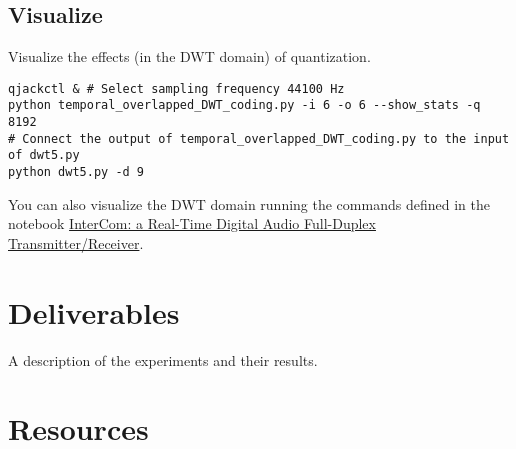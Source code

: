 
\subsection{Visualize}

Visualize the effects (in the DWT domain) of quantization.
\begin{verbatim}
qjackctl & # Select sampling frequency 44100 Hz 
python temporal_overlapped_DWT_coding.py -i 6 -o 6 --show_stats -q 8192
# Connect the output of temporal_overlapped_DWT_coding.py to the input of dwt5.py
python dwt5.py -d 9
\end{verbatim}

You can also visualize the DWT domain running the commands defined in the notebook \href{https://github.com/Tecnologias-multimedia/InterCom/blob/master/docs/2-hours_seminar.ipynb}{InterCom: a Real-Time Digital Audio Full-Duplex Transmitter/Receiver}.



\section{Deliverables}
A description of the experiments and their results.

\section{Resources}


